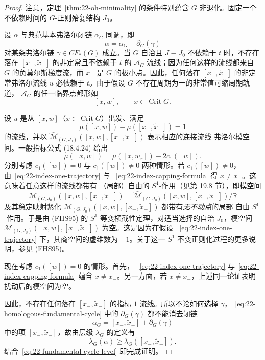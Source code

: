 \begin{proof}
注意，定理~\ref{thm:22-oh-minimality} 的条件特别蕴含 $G$ 非退化。固定一个不依赖时间的
$G$-正则殆复结构 $J_0$。

设 $\alpha$ 与典范基本弗洛尔闭链 $\alpha_G$ 同调，即
\begin{equation}
 \alpha=\alpha_G+\partial_G(\gamma)
 \label{eq:22-homologous-fundamental-cycle}
\end{equation}
对某条弗洛尔链 $\gamma\in CF_*(G)$ 成立。当 $G$ 自治且 $J\equiv J_0$ 不依赖于
$t$ 时，不存在落在 $[x_-,\widetilde x_-]$ 的非定常且不依赖于 $t$ 的
$\mathcal A_G$ 流线；因为任何这样的流线都来自 $G$ 的负莫尔斯梯度流，而 $x_-$
是 $G$ 的极小点。因此，任何落在 $[x_-,\widetilde x_-]$ 的非定常弗洛尔流线 $u$
必依赖于 $t$。由于假设 $G$ 不存在周期为一的非常值可缩周期轨道，
$\mathcal A_G$ 的任一临界点都形如
\[
 [x,w],\qquad x\in\operatorname{Crit}G.
\]

设 $u$ 是从 $[x,w]$（$x\in\operatorname{Crit}G$）出发、满足
\begin{equation}
 \mu([x,w])-\mu([x_-,\widetilde x_-])=1
 \label{eq:22-index-one-trajectory}
\end{equation}
的流线，并以
$\widehat{\mathcal M}_{(G,J_0)}([x,w],[x_-,\widetilde x_-])$ 表示相应的连接流线
弗洛尔模空间。一般指标公式 (18.4.24) 给出
\begin{equation}
 \mu([x,w])=\mu([x,w_x])-2c_1([w]).
 \label{eq:22-index-capping-formula}
\end{equation}
分别考虑 $c_1([w])=0$ 与 $c_1([w])\neq0$ 两种情形。若
$c_1([w])\neq0$，由~\eqref{eq:22-index-one-trajectory} 与
~\eqref{eq:22-index-capping-formula} 得 $x\neq x_-$。这意味着任意这样的流线都带有
（局部）自由的 $S^1$-作用（见第 19.8 节），即模空间
\[
 \mathcal M_{(G,J_0)}([x,w],[x_-,\widetilde x_-])
 =\widehat{\mathcal M}_{(G,J_0)}([x,w],[x_-,\widetilde x_-])/\mathbb R
\]
及其稳定映射紧化
$\overline{\mathcal M}_{(G,J_0)}([x,w],[x_-,\widetilde x_-])$ 都带有\emph{无不动点}的局部
自由 $S^1$-作用。于是由 (FHS95) 的 $S^1$-等变横截性定理，对适当选择的自治
$J_0$，模空间
$\mathcal M_{(G,J_0)}([x,w],[x_-,\widetilde x_-])$ 为空。这是因为在假设
~\eqref{eq:22-index-one-trajectory} 下，其商空间的虚维数为 $-1$。关于这一
$S^1$-不变正则化过程的更多说明，参见 (FHS95)。

现在考虑 $c_1([w])=0$ 的情形。首先，
~\eqref{eq:22-index-one-trajectory} 与~\eqref{eq:22-index-capping-formula}
蕴含 $x\neq x_-$。另一方面，若 $x\neq x_-$，上述同一论证表明扰动后的模空间为空。

因此，不存在任何落在 $[x_-,\widetilde x_-]$ 的指标 $1$ 流线。所以不论如何选择
$\gamma$，~\eqref{eq:22-homologous-fundamental-cycle} 中的 $\partial_G(\gamma)$
都不能消去闭链
\[
 \alpha_G=[x_-,\widetilde x_-]+\partial_G(\gamma)
\]
中的项 $[x_-,\widetilde x_-]$，故由层级 $\lambda_G$ 的定义有
\[
 \lambda_G(\alpha)\geq\lambda_G([x_-,\widetilde x_-]).
\]
结合~\eqref{eq:22-fundamental-cycle-level} 即完成证明。
\end{proof}

